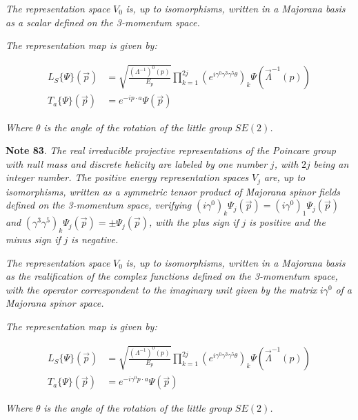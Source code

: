 \documentclass[11pt]{book}
\begin{document}
\emph{The representation space }\(V_0\)\emph{ is, up to isomorphisms,
written in a Majorana basis as a scalar defined on the 3-momentum
space.}

\emph{The representation map is given by: }

\begin{equation}\begin{aligned}
L_S\{\Psi\}(\vec{p})&=\sqrt{\frac{(\Lambda^{-1})^0(p)}{E_p}}\prod_{k=1}^{2j}(e^{i\gamma^0\gamma^3\gamma^5\theta})_k\Psi(\vec{\Lambda}^{-1}(p))\\
T_a\{\Psi\}(\vec{p})&=e^{-i p\cdot a}\Psi(\vec{p})\end{aligned}\end{equation}

\emph{ Where }\(\theta\)\emph{ is the angle of the rotation of the
little group }\(SE(2)\)\emph{.}

\textbf{Note 83}. \emph{The real irreducible projective representations
of the Poincare group with null mass and discrete helicity are labeled
by one number }\(j\)\emph{, with }\(2j\)\emph{ being an integer number.
The positive energy representation spaces }\(V_j\)\emph{ are, up to
isomorphisms, written as a symmetric tensor product of Majorana spinor
fields defined on the 3-momentum space, verifying
}\((i\gamma^0)_k\Psi_j(\vec{p})=(i\gamma^0)_1\Psi_j(\vec{p})\)\emph{ and
}\((\gamma^3\gamma^5)_k\Psi_j(\vec{p})=\pm \Psi_j(\vec{p})\)\emph{, with
the plus sign if }\(j\)\emph{ is positive and the minus sign if
}\(j\)\emph{ is negative.}

\emph{The representation space }\(V_0\)\emph{ is, up to isomorphisms,
written in a Majorana basis as the realification of the complex
functions defined on the 3-momentum space, with the operator
correspondent to the imaginary unit given by the matrix
}\(i\gamma^0\)\emph{ of a Majorana spinor space.}

\emph{The representation map is given by: }

\begin{equation}\begin{aligned}
L_S\{\Psi\}(\vec{p})&=\sqrt{\frac{(\Lambda^{-1})^0(p)}{E_p}}\prod_{k=1}^{2j}(e^{i\gamma^0\gamma^3\gamma^5\theta})_k\Psi(\vec{\Lambda}^{-1}(p))\\
T_a\{\Psi\}(\vec{p})&=e^{-i\gamma^0 p\cdot a}\Psi(\vec{p})\end{aligned}\end{equation}

\emph{ Where }\(\theta\)\emph{ is the angle of the rotation of the
little group }\(SE(2)\)\emph{.}
\end{document}

